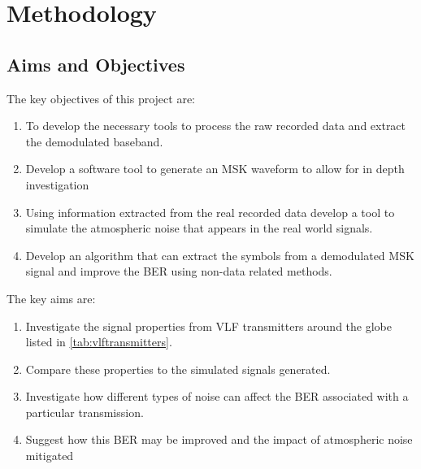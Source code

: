 \chapter{Methodology}

\section{Aims and Objectives}

The key objectives of this project are:

\begin{enumerate}
    \item To develop the necessary tools to process the raw recorded data and extract the demodulated baseband.
    \item Develop a software tool to generate an MSK waveform to allow for in depth investigation
    \item Using information extracted from the real recorded data develop a tool to simulate the atmospheric noise that appears in the real world signals.
    \item Develop an algorithm that can extract the symbols from a demodulated MSK signal and improve the BER using non-data related methods.
\end{enumerate}

The key aims are:

\begin{enumerate}
    \item Investigate the signal properties from VLF transmitters around the globe listed in \ref{tab:vlftransmitters}. 
    \item Compare these properties to the simulated signals generated.
    \item Investigate how different types of noise can affect the BER associated with a particular transmission.
    \item Suggest how this BER may be improved and the impact of atmospheric noise mitigated
\end{enumerate}
